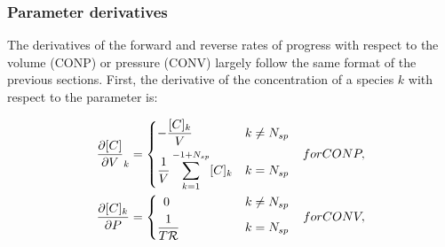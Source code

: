 \documentclass[12pt]{article}
\newcommand{\ns}{N_{sp}}
\newcommand{\conp}{CONP}
\newcommand{\conv}{CONV}
\newcommand{\dconp}{\ifmmode\text{for \conp,}\else for \conp,\fi}
\newcommand{\dconv}{\ifmmode\text{for \conv,}\else for \conv,\fi}
\newcommand{\Ru}{\mathcal{R}}
\begin{document}
\subsubsection{Parameter derivatives}
The derivatives of the forward and reverse rates of progress with respect to the volume (\conp) or pressure (\conv) largely follow the same format of the previous sections.
First, the derivative of the concentration of a species $k$ with respect to the parameter is:

\begin{subequations}
 \begin{align}
 \frac{\partial [C] }{\partial V }_{k} &=
 \begin{dcases}
  \mathrlap{-\frac{[C]_{k}}{V}}\hphantom{\frac{1}{V} \sum_{k=1}^{-1 + \ns} [C]_{k}} & k \ne \ns \\
  \frac{1}{V} \sum_{k=1}^{-1 + \ns} [C]_{k} & k = \ns
 \end{dcases}&\dconp \\
 \frac{\partial [C]_{k} }{\partial P } &=
 \begin{dcases}
  \mathrlap{\hphantom{0}0}\hphantom{\frac{1}{V} \sum_{k=1}^{-1 + \ns} [C]_{k}} & k \ne \ns \\
  \mathrlap{\frac{1}{T \Ru}}\hphantom{\frac{1}{V} \sum_{k=1}^{-1 + \ns} [C]_{k}} & k = \ns
 \end{dcases}&\dconv
 \end{align}
\end{subequations}
\end{document}
